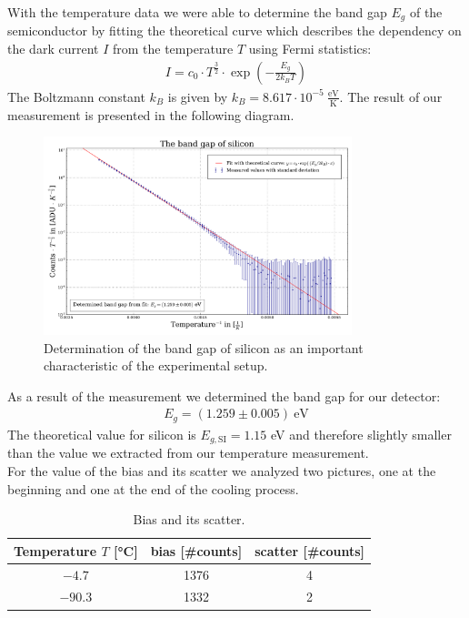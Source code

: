 With  the temperature data we were able to determine the band gap $E_g$ of the semiconductor by fitting the theoretical curve which describes the dependency on the dark current $I$ from the temperature $T$ using Fermi statistics:
\begin{align}
	I = c_0 \cdot T^{\frac{3}{2}}\cdot\exp(-\frac{E_g}{2 k_B T}) \label{eqn: dark current}
\end{align}
The Boltzmann constant $k_B$ is given by $k_B = 8.617 \cdot 10^{-5} \ \frac{\text{eV}}{\text{K}}$.
The result of our measurement is presented in the following diagram.
\begin{figure}[H]
\centering
\includegraphics[width=0.8\textwidth]{figures/Plots/band_gap.pdf}
\caption[Determination of the band gap of silicon]{Determination of the band gap of silicon as an important characteristic of the experimental setup.}	
\end{figure}
As a result of the measurement we determined the band gap for our detector:
\begin{align}
	E_g = (1.259 \pm 0.005) \ \text{eV}
\end{align}
The theoretical value for silicon is $E_{g, \text{SI}} = 1.15$ eV and therefore slightly smaller than the value we extracted from our temperature measurement. \\
For the value of the bias and its scatter we analyzed two pictures, one  at the beginning and one at the end of the cooling process.
\begin{table}[H]
\setlength{\tabcolsep}{5mm}
\setlength\extrarowheight{2mm}
\centering
\begin{tabular}{c| c c }

 Temperature $T$ [°C] & bias [\#counts] & scatter [\#counts] \\ \hline 

$-4.7$ & 1376 & 4 \\
$-90.3$ & 1332 &  2  \\

\end{tabular}
\caption{Bias and its scatter.}
\end{table}

